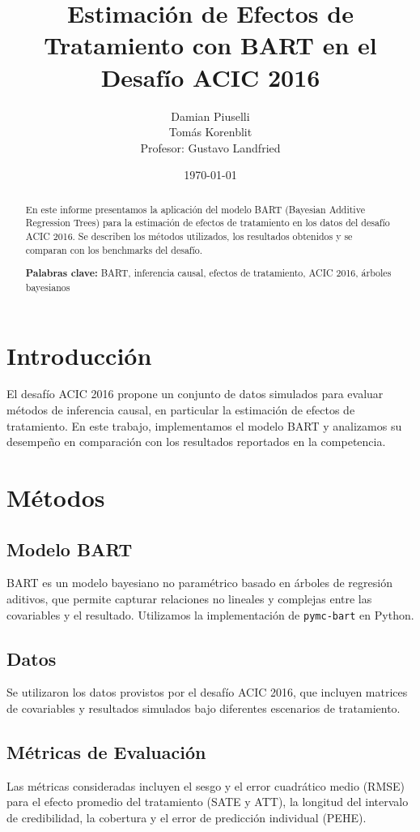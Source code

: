 \documentclass[a4paper,12pt]{article}
\title{Estimación de Efectos de Tratamiento con BART en el Desafío ACIC 2016}
\author{Damian Piuselli \\ Tomás Korenblit \\ Profesor: Gustavo Landfried}
\date{\today}
\begin{document}
\maketitle

\begin{abstract}
En este informe presentamos la aplicación del modelo BART (Bayesian Additive Regression Trees) para la estimación de efectos de tratamiento en los datos del desafío ACIC 2016. Se describen los métodos utilizados, los resultados obtenidos y se comparan con los benchmarks del desafío.

\noindent\textbf{Palabras clave:} BART, inferencia causal, efectos de tratamiento, ACIC 2016, árboles bayesianos
\end{abstract}

\section{Introducción}
El desafío ACIC 2016 propone un conjunto de datos simulados para evaluar métodos de inferencia causal, en particular la estimación de efectos de tratamiento. En este trabajo, implementamos el modelo BART y analizamos su desempeño en comparación con los resultados reportados en la competencia.

\section{Métodos}
\subsection{Modelo BART}
BART es un modelo bayesiano no paramétrico basado en árboles de regresión aditivos, que permite capturar relaciones no lineales y complejas entre las covariables y el resultado. Utilizamos la implementación de \texttt{pymc-bart} en Python.

\subsection{Datos}
Se utilizaron los datos provistos por el desafío ACIC 2016, que incluyen matrices de covariables y resultados simulados bajo diferentes escenarios de tratamiento.

\subsection{Métricas de Evaluación}
Las métricas consideradas incluyen el sesgo y el error cuadrático medio (RMSE) para el efecto promedio del tratamiento (SATE y ATT), la longitud del intervalo de credibilidad, la cobertura y el error de predicción individual (PEHE).
\end{document}
